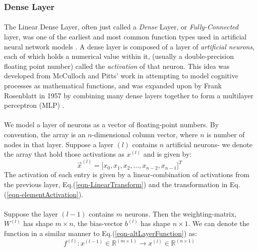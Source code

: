 \documentclass[12pt,letterpaper]{article}
\begin{document}

\subsubsection{Dense Layer}
\label{subsubsec-DenseLayer}

\paragraph*{}The Linear Dense Layer, often just called a \textit{Dense} Layer, or \textit{Fully-Connected} layer, was one of the earliest and most common function types used in artificial neural network models \cite{Geron2,Loy,McCulloch}. A dense layer is composed of a layer of \textit{artificial neurons}, each of which holds a numerical value within it, (usually a double-precision floating point number) called the \textit{activation} of that neuron. This idea was developed from McCulloch and Pitts' work \cite{McCulloch} in attempting to model cognitive processes as mathematical functions, and was expanded upon by Frank Rosenblatt in  1957 by combining many dense layers together to form a multilayer perceptron (MLP) \cite{Geron,Loy,Levine}.

\paragraph*{}We model a layer of neurons as a vector of floating-point numbers. By convention, the array is an $n$-dimensional column vector, where $n$ is number of nodes in that layer. Suppose a layer $(l)$ contains $n$ artificial neurons- we denote the array that hold those activations as $x^{(l)}$ and is given by:
\begin{equation}
\label{layer-DenseNeurons}
\vec{x}^{(l)} = \Big[ x_0, x_1, x_2, \hdots , x_{n-2}, x_{n-1} \Big]^T
\end{equation}
The activation of each entry is given by a linear-combination of activations from the previous layer, Eq.(\ref{eqn-LinearTransform}) and the transformation in Eq.(\ref{eqn-elementActivation}).

\paragraph*{}Suppose the layer $(l-1)$ contains $m$ neurons. Then the weighting-matrix, $W^{(l)}$ has shape $m \times n$, the bias-vector $b^{(l)}$ has shape $n \times 1$. We can denote the function in a similar manner to Eq.(\ref{eqn-altLayerFunction}) as:
\begin{equation}
\label{eqn-FunctionDense}
f^{(l)} : x^{(l-1)} \in \mathbb{R}^{(m \times 1)} \rightarrow x^{(l)} \in \mathbb{R}^{(n \times 1)}
\end{equation}
\end{document}
